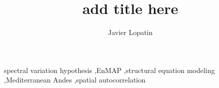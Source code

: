 \documentclass[preprint,12pt]{elsarticle}
\title{add title here}
\author[1,2,3]{Javier Lopatin\corref{cor1}}
\begin{document}
\begin{frontmatter}

\begin{abstract}

\end{abstract}

\begin{keyword}
spectral variation hypothesis \sep EnMAP \sep structural equation modeling \sep Mediterranean Andes \sep spatial autocorrelation
\end{keyword}

\end{frontmatter}

\linenumbers










\end{document}

